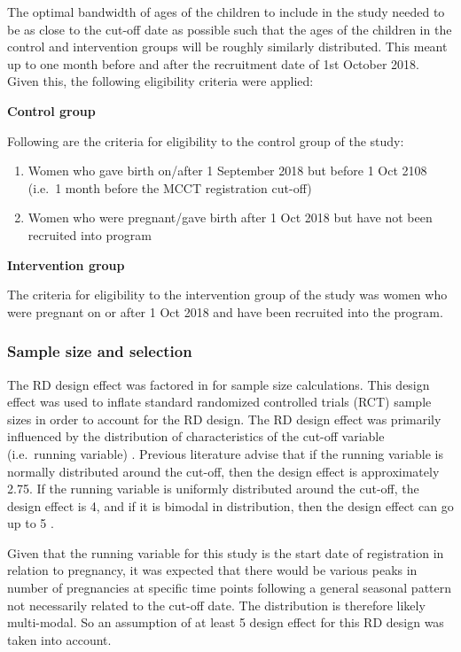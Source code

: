\documentclass[12pt,a4paper]{article}
\begin{document}
The optimal bandwidth of ages of the children to include in the study needed to be as close to the cut-off date as possible such that the ages of the children in the control and intervention groups will be roughly similarly distributed. This meant up to one month before and after the recruitment date of 1st October 2018. Given this, the following eligibility criteria were applied:

\textbf{Control group}

Following are the criteria for eligibility to the control group of the study:

\begin{enumerate}
\def\labelenumi{\arabic{enumi}.}
\item
  Women who gave birth on/after 1 September 2018 but before 1 Oct 2108 (i.e.~1 month before the MCCT registration cut-off)
\item
  Women who were pregnant/gave birth after 1 Oct 2018 but have not been recruited into program
\end{enumerate}

\textbf{Intervention group}

The criteria for eligibility to the intervention group of the study was women who were pregnant on or after 1 Oct 2018 and have been recruited into the program.

\hypertarget{sample-size-and-selection}{%
\subsubsection{Sample size and selection}\label{sample-size-and-selection}}

The RD design effect was factored in for sample size calculations. This design effect was used to inflate standard randomized controlled trials (RCT) sample sizes in order to account for the RD design. The RD design effect was primarily influenced by the distribution of characteristics of the cut-off variable (i.e.~running variable) \citep{Bor2014}. Previous literature advise that if the running variable is normally distributed around the cut-off, then the design effect is approximately 2.75. If the running variable is uniformly distributed around the cut-off, the design effect is 4, and if it is bimodal in distribution, then the design effect can go up to 5 \citep{Schochet2009}.

Given that the running variable for this study is the start date of registration in relation to pregnancy, it was expected that there would be various peaks in number of pregnancies at specific time points following a general seasonal pattern not necessarily related to the cut-off date. The distribution is therefore likely multi-modal. So an assumption of at least 5 design effect for this RD design was taken into account.
\end{document}
